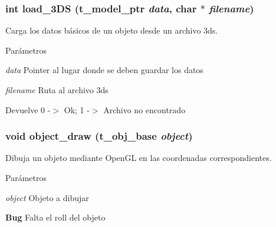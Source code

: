 \subsubsection[{load\_\-3DS}]{\setlength{\rightskip}{0pt plus 5cm}int load\_\-3DS ({\bf t\_\-model\_\-ptr} {\em data}, \/  char $\ast$ {\em filename})}\label{objetos_8h_a191f00b4d95e50b73000ed459c27ee37}


Carga los datos básicos de un objeto desde un archivo 3ds. 
\begin{DoxyParams}{Parámetros}
\item[{\em data}]Pointer al lugar donde se deben guardar los datos \item[{\em filename}]Ruta al archivo 3ds \end{DoxyParams}
\begin{DoxyReturn}{Devuelve}
0 -\/$>$ Ok; 1 -\/$>$ Archivo no encontrado 
\end{DoxyReturn}
\subsubsection[{object\_\-draw}]{\setlength{\rightskip}{0pt plus 5cm}void object\_\-draw ({\bf t\_\-obj\_\-base} {\em object})}\label{objetos_8h_a0ac96b56eb1c63648a05e7c1fc4a857b}


Dibuja un objeto mediante OpenGL en las coordenadas correspondientes. 
\begin{DoxyParams}{Parámetros}
\item[{\em object}]Objeto a dibujar \end{DoxyParams}
\begin{Desc}
\item[{\bf Bug}]Falta el roll del objeto \end{Desc}
